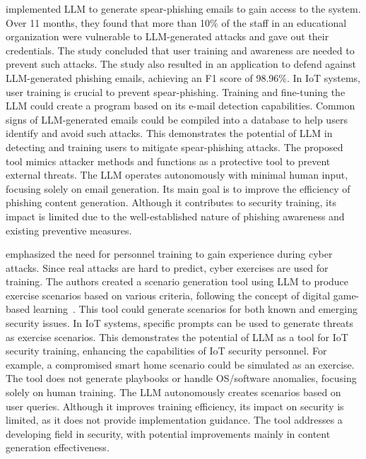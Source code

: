 \smallskip
\noindent \textbf{\citet{bethany2024large}} implemented LLM to generate spear-phishing emails to gain access to the system.
Over 11 months, they found that more than 10\% of the staff in an educational organization were vulnerable to LLM-generated attacks and gave out their credentials.
The study concluded that user training and awareness are needed to prevent such attacks.
The study also resulted in an application to defend against LLM-generated phishing emails, achieving an F1 score of 98.96\%.
In IoT systems, user training is crucial to prevent spear-phishing.
Training and fine-tuning the LLM could create a program based on its e-mail detection capabilities.
Common signs of LLM-generated emails could be compiled into a database to help users identify and avoid such attacks.
This demonstrates the potential of LLM in detecting and training users to mitigate spear-phishing attacks.
The proposed tool mimics attacker methods and functions as a protective tool to prevent external threats.
The LLM operates autonomously with minimal human input, focusing solely on email generation.
Its main goal is to improve the efficiency of phishing content generation.
Although it contributes to security training, its impact is limited due to the well-established nature of phishing awareness and existing preventive measures.

\smallskip
\noindent \textbf{\citet{yamin2024}} emphasized the need for personnel training to gain experience during cyber attacks.
Since real attacks are hard to predict, cyber exercises are used for training.
The authors created a scenario generation tool using LLM to produce exercise scenarios based on various criteria, following the concept of digital game-based learning~\citet{digitalgamebasedlearning}.
This tool could generate scenarios for both known and emerging security issues.
In IoT systems, specific prompts can be used to generate threats as exercise scenarios.
This demonstrates the potential of LLM as a tool for IoT security training, enhancing the capabilities of IoT security personnel.
For example, a compromised smart home scenario could be simulated as an exercise.
The tool does not generate playbooks or handle OS/software anomalies, focusing solely on human training.
The LLM autonomously creates scenarios based on user queries.
Although it improves training efficiency, its impact on security is limited, as it does not provide implementation guidance.
The tool addresses a developing field in security, with potential improvements mainly in content generation effectiveness.

